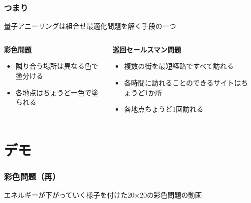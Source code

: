 \begin{frame}
  \frametitle{つまり}

  {\Large   量子アニーリングは組合せ最適化問題を解く手段の一つ}
  \vspace{5mm}

  \begin{columns}
    \begin{column}{0.45\textwidth}
      \textbf{彩色問題}
      \begin{itemize}
          \item 隣り合う場所は異なる色で塗分ける
          \item {\color{important_font}各地点はちょうど一色で塗られる}
      \end{itemize}
    \end{column}

    \begin{column}{0.45\textwidth}
      \textbf{巡回セールスマン問題}
      \begin{itemize}
          \item 複数の街を最短経路ですべて訪れる
          \item {\color{important_font}各時間に訪れることのできるサイトはちょうど1か所}
          \item {\color{important_font}各地点ちょうど1回訪れる}
      \end{itemize}
    \end{column}
  \end{columns}
  \vspace{5mm}
\end{frame}

\section{デモ}
\begin{frame}
  \frametitle{彩色問題（再）}
  エネルギーが下がっていく様子を付けた20×20の彩色問題の動画
\end{frame}

